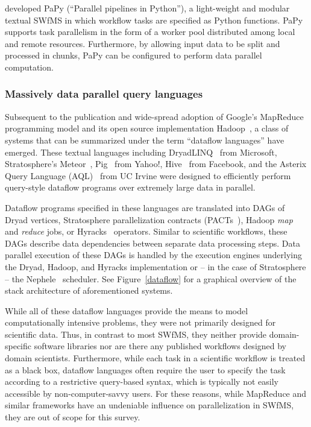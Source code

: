 \citet{Cieslik11} developed PaPy (``Parallel pipelines in Python''), a light-weight and modular textual SWfMS in which workflow tasks are specified as Python functions. PaPy supports task parallelism in the form of a worker pool distributed among local and remote resources. Furthermore, by allowing input data to be split and processed in chunks, PaPy can be configured to perform data parallel computation. 



\subsubsection{Massively data parallel query languages}
Subsequent to the publication and wide-spread adoption of Google's MapReduce~\citep{Dean08} programming model and its open source implementation Hadoop~\citep{White10}, a class of systems that can be summarized under the term ``dataflow languages'' have emerged. These textual languages including DryadLINQ~\citep{Yu08} from Microsoft, Stratosphere's Meteor~\citep{Heise2012}, Pig~\citep{Olston08} from Yahoo!, Hive~\citep{Thusoo2009} from Facebook, and the Asterix Query Language (AQL)~\citep{Behm2011} from UC Irvine were designed to efficiently perform query-style dataflow programs over extremely large data in parallel.

Dataflow programs specified in these languages are translated into DAGs of Dryad vertices, Stratosphere parallelization contracts (PACTs~\citep{Battre10}), Hadoop \textit{map} and \textit{reduce} jobs, or Hyracks~\citep{Borkar2011} operators. Similar to scientific workflows, these DAGs describe data dependencies between separate data processing steps. Data parallel execution of these DAGs is handled by the execution engines underlying the Dryad, Hadoop, and Hyracks implementation or -- in the case of Stratosphere -- the Nephele~\citep{Warneke09} scheduler. See Figure~\ref{dataflow} for a graphical overview of the stack architecture of aforementioned systems.



While all of these dataflow languages provide the means to model computationally intensive problems, they were not primarily designed for scientific data. Thus, in contrast to most SWfMS, they neither provide domain-specific software libraries nor are there any published workflows designed by domain scientists. Furthermore, while each task in a scientific workflow is treated as a black box, dataflow languages often require the user to specify the task according to a restrictive query-based syntax, which is typically not easily accessible by non-computer-savvy users. For these reasons, while MapReduce and similar frameworks have an undeniable influence on parallelization in SWfMS, they are out of scope for this survey.

